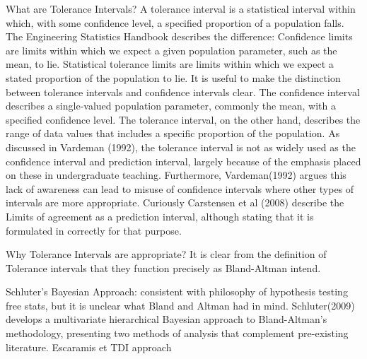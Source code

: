 What are Tolerance Intervals?
A tolerance interval is a statistical interval within which, with some confidence level, a specified proportion of a population falls.
The Engineering Statistics Handbook describes the difference: Confidence limits are limits within which we expect a given population parameter, such as the mean, to lie. Statistical tolerance limits are limits within which we expect a stated proportion of the population to lie.
It is useful to make the distinction between tolerance intervals and confidence intervals clear. The confidence interval describes a single-valued population parameter, commonly the mean, with a specified confidence level. The tolerance interval, on the other hand, describes the range of data values that includes a specific proportion of the population.
As discussed in Vardeman (1992), the tolerance interval is not as widely used as the confidence interval and prediction interval, largely because of the emphasis placed on these in undergraduate teaching. Furthermore, Vardeman(1992) argues this lack of awareness can lead to misuse of confidence intervals where other types of intervals are more appropriate.
Curiously Carstensen et al (2008) describe the Limits of agreement as a prediction interval, although stating that it is formulated in correctly for that purpose.

Why Tolerance Intervals are appropriate?
It is clear from the definition of Tolerance intervals that they function precisely as Bland-Altman intend.

Schluter’s Bayesian Approach: 
consistent with philosophy of hypothesis testing free stats, but it is unclear what Bland and Altman had in mind.
Schluter(2009) develops a multivariate hierarchical Bayesian approach to Bland-Altman’s methodology, presenting two methods of analysis that complement pre-existing literature.
Escaramis et TDI approach

